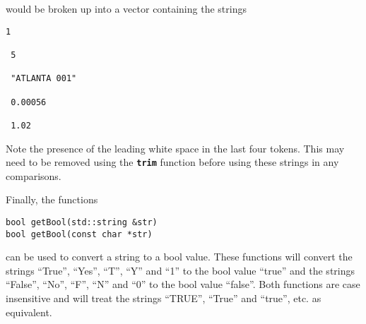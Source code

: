 would be broken up into a vector containing the strings

{
\color{red}
\begin{Verbatim}[fontseries=b]
1

 5

 "ATLANTA 001"

 0.00056

 1.02
\end{Verbatim}
}
Note the presence of the leading white space in the last four tokens. This may
need to be removed using the \texttt{\textbf{trim}} function before using these
strings in any comparisons.

Finally, the functions

{
\color{red}
\begin{Verbatim}[fontseries=b]
bool getBool(std::string &str)
bool getBool(const char *str)
\end{Verbatim}
}

can be used to convert a string to a bool value. These functions
will convert the strings ``True'', ``Yes'', ``T'', ``Y'' and ``1'' to
the bool value ``true'' and the strings ``False'', ``No'', ``F'', ``N'' and
``0'' to the bool value ``false''. Both functions are case insensitive and will
treat the strings ``TRUE'', ``True'' and ``true'', etc. as equivalent.
